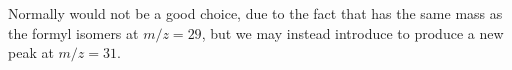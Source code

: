 Normally  would not be a good choice, due to the fact that  has the same mass as the formyl isomers at $m/z=29$, but we may instead introduce  to produce a new peak at $m/z=31$.
